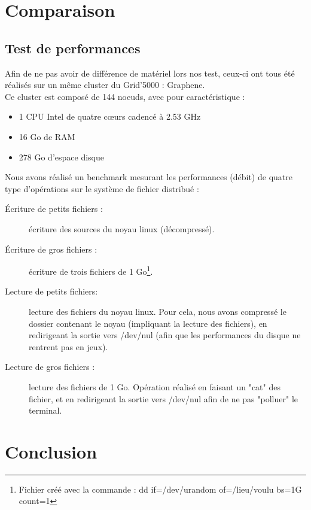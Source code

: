 \documentclass[12pt]{report}
\begin{document}
	\chapter{Comparaison}
		\section{Test de performances}
			Afin de ne pas avoir de différence de matériel lors nos test, ceux-ci ont tous été réalisés sur un même cluster du Grid'5000 : Graphene.\\

			Ce cluster est composé de 144 noeuds, avec pour caractéristique :
			\begin{itemize}
				\item 1 CPU Intel de quatre cœurs cadencé à 2.53 GHz
				\item 16 Go de RAM
				\item 278 Go d'espace disque\\
			\end{itemize}

			Nous avons réalisé un benchmark mesurant les performances (débit) de quatre type d'opérations sur le système de fichier distribué :
			\begin{description}
				\item[Écriture de petits fichiers :] écriture des sources du noyau linux (décompressé).
				\item[Écriture de gros fichiers :] écriture de trois fichiers de 1 Go\footnote{Fichier créé avec la commande : dd if=/dev/urandom of=/lieu/voulu bs=1G count=1}.
				\item[Lecture de petits fichiers: ] lecture des fichiers du noyau linux.
				Pour cela, nous avons compressé le dossier contenant le noyau (impliquant la lecture des fichiers),
				en redirigeant la sortie vers /dev/nul (afin que les performances du disque ne rentrent pas en jeux).
				\item[Lecture de gros fichiers :] lecture des fichiers de 1 Go. Opération réalisé en faisant un "cat" des fichier,
				et en redirigeant la sortie vers /dev/nul afin de ne pas "polluer" le terminal.
			\end{description}


	\chapter{Conclusion}
\end{document}
